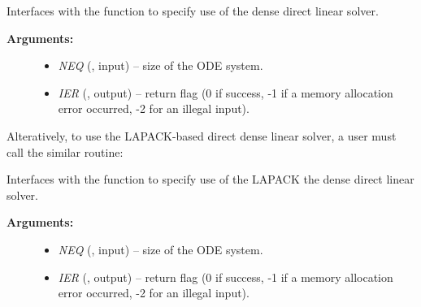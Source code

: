 \documentclass[letterpaper,10pt,english]{sphinxmanual}
\begin{document}
\begin{fulllineitems}
\label{f_interface/Usage:f/_/FARKDENSE}
Interfaces with the {\hyperref[c_interface/User_callable:ARKDense]{}} function to
specify use of the dense direct linear solver.
\begin{description}
\item[{\textbf{Arguments:}}] \leavevmode\begin{itemize}
\item {} 
\emph{NEQ} (, input) -- size of the ODE system.

\item {} 
\emph{IER} (, output) -- return flag (0 if success, -1 if a memory allocation
error occurred, -2 for an illegal input).

\end{itemize}

\end{description}

\end{fulllineitems}


Alteratively, to use the LAPACK-based direct dense linear solver, a
user must call the similar {\hyperref[f_interface/Usage:f/_/FARKLAPACKDENSE]{}} routine:

\begin{fulllineitems}
\label{f_interface/Usage:f/_/FARKLAPACKDENSE}
Interfaces with the {\hyperref[c_interface/User_callable:ARKLapackDense]{}} function
to specify use of the LAPACK the dense direct linear solver.
\begin{description}
\item[{\textbf{Arguments:}}] \leavevmode\begin{itemize}
\item {} 
\emph{NEQ} (, input) -- size of the ODE system.

\item {} 
\emph{IER} (, output) -- return flag (0 if success, -1 if a memory allocation
error occurred, -2 for an illegal input).

\end{itemize}

\end{description}

\end{fulllineitems}
\end{document}
